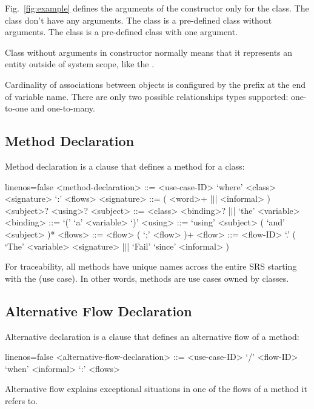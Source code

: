 \documentclass[sigplan,10pt,screen]{acmart}
\begin{document}
Fig.~\ref{fig:example} defines the arguments of the constructor only for
the  class. The class  don't have any arguments. The class
 is a pre-defined class without arguments. The class  is a
pre-defined class with one argument.

Class without arguments in constructor normally means that it represents an
entity outside of system scope, like the .

Cardinality of associations between objects is configured by the 
prefix at the end of variable name. There are only
two possible relationships types supported: one-to-one and one-to-many.

\subsection{Method Declaration}

Method declaration is a clause that defines a method for a class:

\begin{ffcode*}{linenos=false}
<method-declaration> ::= <use-case-ID> `where'
<class> <signature> `:' <flows>
<signature> ::= ( <word>+ |$\vert$| <informal> )
  <subject>? <using>?
<subject> ::= <class> <binding>?
  |$\vert$| `the' <variable>
<binding> ::= `(' `a' <variable> `)'
<using> ::= `using' <subject>
  ( `and' <subject> )*
<flows> ::= <flow> ( `;' <flow> )+
<flow> ::= <flow-ID> `.'
  (
    `The' <variable> <signature>
    |$\vert$|
    `Fail' `since' <informal>
  )
\end{ffcode*}

For traceability, all methods have unique names across the entire
SRS starting with the  (use case). In other words,
methods are use cases owned by classes.

\subsection{Alternative Flow Declaration}

Alternative declaration is a clause that defines an alternative
flow of a method:

\begin{ffcode*}{linenos=false}
<alternative-flow-declaration> ::=
  <use-case-ID> `/' <flow-ID>
  `when' <informal> `:' <flows>
\end{ffcode*}

Alternative flow explains exceptional situations in one of the
flows of a method it refers to.
\end{document}
